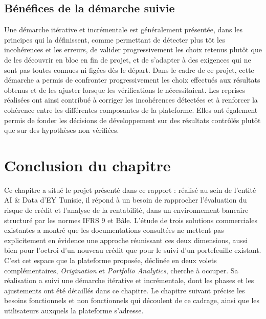 \subsection{Bénéfices de la démarche suivie}

Une démarche itérative et incrémentale est généralement présentée, dans les principes qui la définissent, comme permettant de détecter plus tôt les incohérences et les erreurs, de valider progressivement les choix retenus plutôt que de les découvrir en bloc en fin de projet, et de s'adapter à des exigences qui ne sont pas toutes connues ni figées dès le départ. Dans le cadre de ce projet, cette démarche a permis de confronter progressivement les choix effectués aux résultats obtenus et de les ajuster lorsque les vérifications le nécessitaient. Les reprises réalisées ont ainsi contribué à corriger les incohérences détectées et à renforcer la cohérence entre les différentes composantes de la plateforme. Elles ont également permis de fonder les décisions de développement sur des résultats contrôlés plutôt que sur des hypothèses non vérifiées.

\section*{Conclusion du chapitre}

Ce chapitre a situé le projet présenté dans ce rapport : réalisé au sein de l'entité AI \& Data d'EY Tunisie, il répond à un besoin de rapprocher l'évaluation du risque de crédit et l'analyse de la rentabilité, dans un environnement bancaire structuré par les normes IFRS 9 et Bâle. L'étude de trois solutions commerciales existantes a montré que les documentations consultées ne mettent pas explicitement en évidence une approche réunissant ces deux dimensions, aussi bien pour l'octroi d'un nouveau crédit que pour le suivi d'un portefeuille existant. C'est cet espace que la plateforme proposée, déclinée en deux volets complémentaires, \emph{Origination} et \emph{Portfolio Analytics}, cherche à occuper. Sa réalisation a suivi une démarche itérative et incrémentale, dont les phases et les ajustements ont été détaillés dans ce chapitre. Le chapitre suivant précise les besoins fonctionnels et non fonctionnels qui découlent de ce cadrage, ainsi que les utilisateurs auxquels la plateforme s'adresse.
